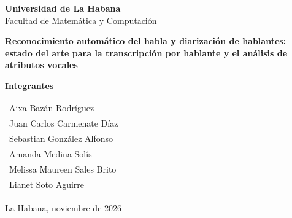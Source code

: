 \documentclass[11pt,a4paper]{article}
\begin{document}
\decimalpoint

\begin{titlepage}
\centering
\vspace*{1cm}
{\Large\textbf{Universidad de La Habana}}\\[0.4cm]
{\large Facultad de Matemática y Computación}\\
\vfill

{\LARGE\bfseries Reconocimiento automático del habla y diarización de hablantes:\\[0.3cm]
estado del arte para la transcripción por hablante y el análisis de atributos vocales}\\
\vfill

{\large\textbf{Integrantes}}\\[0.6cm]
\begin{tabular}{p{9cm}}
	\centering
	Aixa Bazán Rodríguez\\[0.6cm]
	Juan Carlos Carmenate Díaz\\[0.6cm]
	Sebastian González Alfonso\\[0.6cm]
	Amanda Medina Solís\\[0.6cm]
	Melissa Maureen Sales Brito\\[0.6cm]
	Lianet Soto Aguirre\\
\end{tabular}

\vfill
{\large La Habana, noviembre de 2026}
\end{titlepage}

\end{document}
